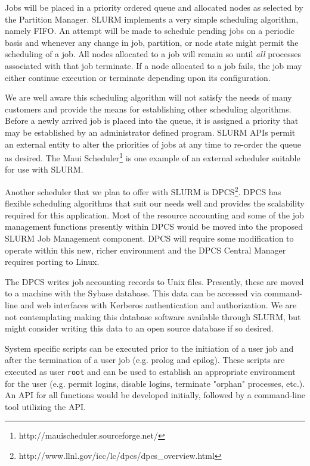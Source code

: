 Jobs will be placed in a priority ordered queue and allocated nodes as 
selected by the Partition Manager. 
SLURM implements a very simple scheduling algorithm, namely FIFO. 
An attempt will be made to schedule pending jobs on a periodic basis
and whenever any change in job, partition, or node state might permit
the scheduling of a job.  All nodes allocated to a job will remain so
until {\em all} processes associated with that job terminate.  If a
node allocated to a job fails, the job may either continue execution or
terminate depending upon its configuration.

We are well aware this scheduling algorithm will not satisfy the needs of many
customers and provide the means for establishing other scheduling
algorithms. Before a newly arrived job is placed into the queue, it
is assigned a priority that may be established by an administrator
defined program. SLURM APIs permit an external entity to alter the
priorities of jobs at any time to re-order the queue as desired.
The Maui Scheduler\footnote{http://mauischeduler.sourceforge.net/}
is one example of an external scheduler suitable for use with SLURM.

Another scheduler that we plan to offer with SLURM is
DPCS\footnote{http://www.llnl.gov/icc/lc/dpcs/dpcs\_overview.html}.  DPCS
has flexible scheduling algorithms that suit our needs well and provides
the scalability required for this application. Most of the resource
accounting and some of the job management functions presently within
DPCS would be moved into the proposed SLURM Job Management component.
DPCS will require some modification to operate within this new, richer
environment and the DPCS Central Manager requires porting to Linux.

The DPCS writes job accounting records to Unix files. Presently, these are
moved to a machine with the Sybase database. This data can be accessed
via command-line and web interfaces with Kerberos authentication and
authorization.  We are not contemplating making this database software
available through SLURM, but might consider writing this data to an open
source database if so desired.

System specific scripts can be executed prior to the initiation of a user
job and after the termination of a user job (e.g. prolog and epilog).
These scripts are executed as user {\tt root} and can be used to establish
an appropriate environment for the user (e.g. permit logins, disable
logins, terminate "orphan" processes, etc.).  An API for all functions
would be developed initially, followed by a command-line tool utilizing
the API.

